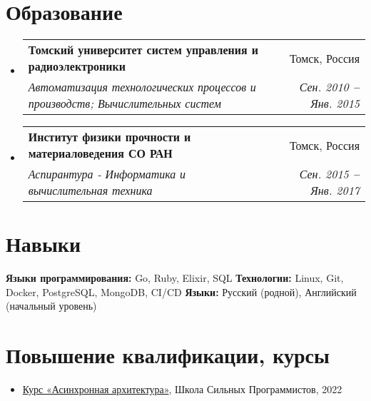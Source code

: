 \documentclass[letterpaper,11pt]{article}
\makeatletter
\newcommand{\resumeItem}[1]{
  \item\small{
    {#1 \vspace{-2pt}}
  }
}
\newcommand{\resumeSubheading}[4]{
  \vspace{-2pt}\item
    \begin{tabular*}{0.97\textwidth}[t]{l@{\extracolsep{\fill}}r}
      \textbf{#1} & #2 \\
      \textit{\small#3} & \textit{\small #4} \\
    \end{tabular*}\vspace{-7pt}
}
\newcommand{\resumeSubItem}[1]{\resumeItem{#1}\vspace{-4pt}}
\newcommand{\resumeSubHeadingListStart}{\begin{itemize}[leftmargin=0.15in, label={}]}
\newcommand{\resumeSubHeadingListEnd}{\end{itemize}}
\makeatother
\begin{document}
\section{Образование}
  \vspace{3pt}
  \resumeSubHeadingListStart
    \resumeSubheading
      {Томский университет систем управления и радиоэлектроники}{Томск, Россия}
      {Автоматизация технологических процессов и производств; Вычислительных систем}{Сен. 2010 \textbf{--} Янв. 2015}
    \resumeSubheading
      {Институт физики прочности и материаловедения СО РАН}{Томск, Россия}
      {Аспирантура - Информатика и вычислительная техника}{Сен. 2015 \textbf{--}  Янв. 2017}
  \resumeSubHeadingListEnd
\section{Навыки}
\vspace{2pt}
\resumeSubHeadingListStart
\small{\item{
\textbf{Языки программирования:} Go, Ruby, Elixir, SQL \vspace{3pt}
\textbf{Технологии:} Linux, Git, Docker, PostgreSQL, MongoDB, CI/CD \vspace{3pt}
\textbf{Языки:} Русский (родной), Английский (начальный уровень)
}}
\resumeSubHeadingListEnd

\section{Повышение квалификации, курсы}
\vspace{2pt}
\resumeSubHeadingListStart
\resumeSubItem{\href{https://cert.tough-dev.school/9iEfy3ppz8G5DMLcTsqkxT/ru}{Курс «Асинхронная архитектура»}, Школа Сильных Программистов, 2022}
\resumeSubHeadingListEnd
\end{document}
